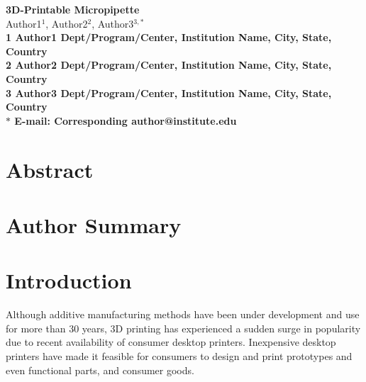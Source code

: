 \date{}

\pagestyle{myheadings}







\begin{flushleft}
{\Large
\textbf{3D-Printable Micropipette}
}
\\
Author1$^{1}$, 
Author2$^{2}$, 
Author3$^{3,\ast}$
\\
\bf{1} Author1 Dept/Program/Center, Institution Name, City, State, Country
\\
\bf{2} Author2 Dept/Program/Center, Institution Name, City, State, Country
\\
\bf{3} Author3 Dept/Program/Center, Institution Name, City, State, Country
\\
$\ast$ E-mail: Corresponding author@institute.edu
\end{flushleft}

\section*{Abstract}

\section*{Author Summary}



\section*{Introduction}

Although additive manufacturing methods have been under development and use for more than 30 years, 3D printing has experienced a sudden surge in popularity due to recent availability of consumer desktop printers. 
Inexpensive desktop printers have made it feasible for consumers to design and print prototypes and even functional parts, and consumer goods.

